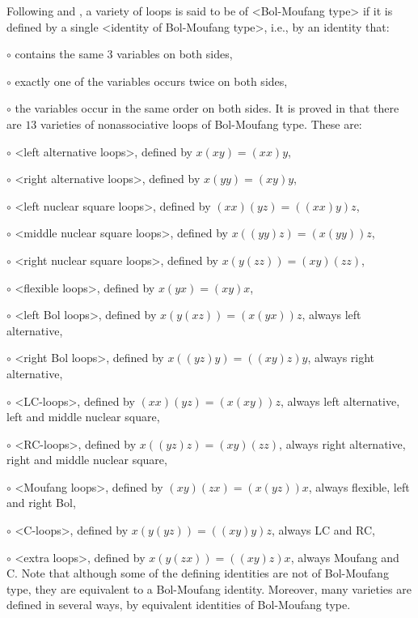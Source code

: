 Following \cite{Fe} and \cite{PhVo}, a variety of loops is said to be of
<Bol-Moufang type> if it is defined by a single
<identity of Bol-Moufang type>, i.e., by an
identity that:
\beginlist%
\item{$\circ$}
    contains the same $3$ variables on both sides,
\item{$\circ$}
     exactly one of the variables occurs twice on both sides,
\item{$\circ$}
     the variables occur in the same order on both sides.
\endlist
It is proved in \cite{PhVo} that there are $13$ varieties of nonassociative loops
of Bol-Moufang type. These are:
\beginlist%
\item{$\circ$}
    <left alternative loops>, defined by $x(xy) = (xx)y$,
\item{$\circ$}
    <right alternative loops>, defined by $x(yy) = (xy)y$,
\item{$\circ$}
    <left nuclear square loops>, defined by $(xx)(yz) = ((xx)y)z$,
\item{$\circ$}
    <middle nuclear square loops>, defined by $x((yy)z) = (x(yy))z$,
\item{$\circ$}
    <right nuclear square loops>, defined by $x(y(zz)) = (xy)(zz)$,
\item{$\circ$}
    <flexible loops>, defined by $x(yx) = (xy)x$,
\item{$\circ$}
    <left Bol loops>, defined by $x(y(xz)) = (x(yx))z$,
    always left alternative,
\item{$\circ$}
    <right Bol loops>, defined by $x((yz)y) = ((xy)z)y$,
    always right alternative,
\item{$\circ$}
    <LC-loops>, defined by $(xx)(yz) = (x(xy))z$,
    always left alternative, left and middle nuclear square,
\item{$\circ$}
    <RC-loops>, defined by $x((yz)z) = (xy)(zz)$,
    always right alternative, right and middle nuclear square,
\item{$\circ$}
    <Moufang loops>, defined by $(xy)(zx) = (x(yz))x$,
    always flexible, left and right Bol,
\item{$\circ$}
    <C-loops>, defined by $x(y(yz)) = ((xy)y)z$,
    always LC and RC,
\item{$\circ$}
    <extra loops>, defined by $x(y(zx)) = ((xy)z)x$,
    always Moufang and C.
\endlist
Note that although some of the defining identities are not of Bol-Moufang type,
they are equivalent to a Bol-Moufang identity. Moreover, many varieties are
defined in several ways, by equivalent identities of Bol-Moufang type.

